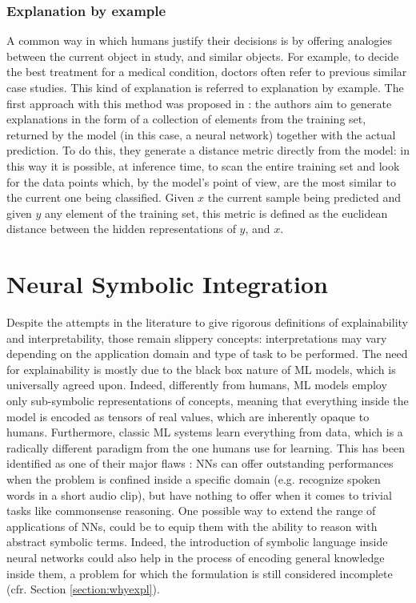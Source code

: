 \subsubsection{Explanation by example}
A common way in which humans justify their decisions is by offering analogies between the current object in study, and similar objects. For example, to decide the best treatment for a medical condition, doctors often refer to previous similar case studies. This kind of explanation is referred to explanation by example. The first approach with this method was proposed in \cite{caruana1999case}: the authors aim to generate explanations in the form of a collection of elements from the training set, returned by the model (in this case, a neural network) together with the actual prediction. To do this, they generate a distance metric directly from the model: in this way it is possible, at inference time, to scan the entire training set and look for the data points which, by the model's point of view, are the most similar to the current one being classified. Given $x$ the current sample being predicted and given $y$ any element of the training set, this metric is defined as the euclidean distance between the hidden representations of $y$, and $x$.

\section{Neural Symbolic Integration}
Despite the attempts in the literature to give rigorous definitions of explainability and interpretability, those remain slippery concepts: interpretations may vary depending on the application domain and type of task to be performed. The need for explainability is mostly due to the black box nature of ML models, which is universally agreed upon. Indeed, differently from humans, ML models employ only sub-symbolic representations of concepts, meaning that everything inside the model is encoded as tensors of real values, which are inherently opaque to humans. Furthermore, classic ML systems learn everything from data, which is a radically different paradigm from the one humans use for learning. This has been identified as one of their major flaws \cite{marcus2018appraisal}: NNs can offer outstanding performances when the problem is confined inside a specific domain (e.g. recognize spoken words in a short audio clip), but have nothing to offer when it comes to trivial tasks like commonsense reasoning. One possible way to extend the range of applications of NNs, could be to equip them with the ability to reason with abstract symbolic terms. Indeed, the introduction of symbolic language inside neural networks could also help in the process of encoding general knowledge inside them, a problem for which the formulation is still considered incomplete (cfr. Section \ref{section:whyexpl}).  

